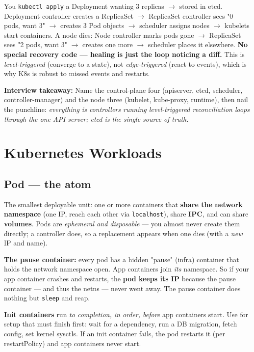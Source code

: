\documentclass[11pt]{article}
\begin{document}
You \texttt{kubectl\ apply} a Deployment wanting 3 replicas \(\rightarrow\) stored in etcd. Deployment controller creates a ReplicaSet \(\rightarrow\) ReplicaSet controller sees "0 pods, want 3" \(\rightarrow\) creates 3 Pod objects \(\rightarrow\) scheduler assigns nodes \(\rightarrow\) kubelets start containers. A node dies: Node controller marks pods gone \(\rightarrow\) ReplicaSet sees "2 pods, want 3" \(\rightarrow\) creates one more \(\rightarrow\) scheduler places it elsewhere. \textbf{No special recovery code --- healing is just the loop noticing a diff.} This is \emph{level-triggered} (converge to a state), not \emph{edge-triggered} (react to events), which is why K8s is robust to missed events and restarts.

\textbf{Interview takeaway:} Name the control-plane four (apiserver, etcd, scheduler, controller-manager) and the node three (kubelet, kube-proxy, runtime), then nail the punchline: \emph{everything is controllers running level-triggered reconciliation loops through the one API server; etcd is the single source of truth.}

\section{Kubernetes Workloads}\label{kubernetes-workloads}

\subsection{Pod --- the atom}\label{pod--the-atom}

The smallest deployable unit: one or more containers that \textbf{share the network namespace} (one IP, reach each other via \texttt{localhost}), share \textbf{IPC}, and can share \textbf{volumes}. Pods are \emph{ephemeral and disposable} --- you almost never create them directly; a controller does, so a replacement appears when one dies (with a \emph{new} IP and name).

\textbf{The pause container:} every pod has a hidden "pause" (infra) container that holds the network namespace open. App containers join \emph{its} namespace. So if your app container crashes and restarts, the \textbf{pod keeps its IP} because the pause container --- and thus the netns --- never went away. The pause container does nothing but \texttt{sleep} and reap.

\textbf{Init containers} run \emph{to completion, in order, before} app containers start. Use for setup that must finish first: wait for a dependency, run a DB migration, fetch config, set kernel sysctls. If an init container fails, the pod restarts it (per restartPolicy) and app containers never start.
\end{document}
